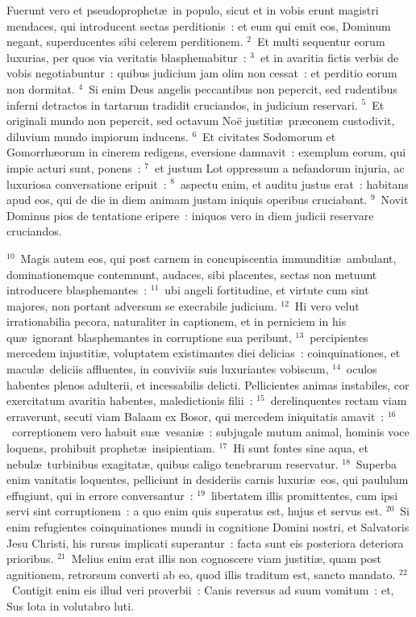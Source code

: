 \lettrine[lines=3,image=true,loversize=0.05,lraise=-0.03]{F}{}uerunt vero et pseudoprophet\ae\ in populo, sicut et in vobis erunt magistri mendaces, qui introducent sectas perditionis~: et eum qui emit eos, Dominum negant, superducentes sibi celerem perditionem.
${}^{2}$~Et multi sequentur eorum luxurias, per quos via veritatis blasphemabitur~:
${}^{3}$~et in avaritia fictis verbis de vobis negotiabuntur~: quibus judicium jam olim non cessat~: et perditio eorum non dormitat.
${}^{4}$~Si enim Deus angelis peccantibus non pepercit, sed rudentibus inferni detractos in tartarum tradidit cruciandos, in judicium reservari.
${}^{5}$~Et originali mundo non pepercit, sed octavum No\"e justiti\ae\ pr\ae conem custodivit, diluvium mundo impiorum inducens.
${}^{6}$~Et civitates Sodomorum et Gomorrh\ae orum in cinerem redigens, eversione damnavit~: exemplum eorum, qui impie acturi sunt, ponens~:
${}^{7}$~et justum Lot oppressum a nefandorum injuria, ac luxuriosa conversatione eripuit~:
${}^{8}$~aspectu enim, et auditu justus erat~: habitans apud eos, qui de die in diem animam justam iniquis operibus cruciabant.
${}^{9}$~Novit Dominus pios de tentatione eripere~: iniquos vero in diem judicii reservare cruciandos.


${}^{10}$~Magis autem eos, qui post carnem in concupiscentia immunditi\ae\ ambulant, dominationemque contemnunt, audaces, sibi placentes, sectas non metuunt introducere blasphemantes~:
${}^{11}$~ubi angeli fortitudine, et virtute cum sint majores, non portant adversum se execrabile judicium.
${}^{12}$~Hi vero velut irrationabilia pecora, naturaliter in captionem, et in perniciem in his qu\ae\ ignorant blasphemantes in corruptione sua peribunt,
${}^{13}$~percipientes mercedem injustiti\ae , voluptatem existimantes diei delicias~: coinquinationes, et macul\ae\ deliciis affluentes, in conviviis suis luxuriantes vobiscum,
${}^{14}$~oculos habentes plenos adulterii, et incessabilis delicti. Pellicientes animas instabiles, cor exercitatum avaritia habentes, maledictionis filii~:
${}^{15}$~derelinquentes rectam viam erraverunt, secuti viam Balaam ex Bosor, qui mercedem iniquitatis amavit~:
${}^{16}$~correptionem vero habuit su\ae\ vesani\ae~: subjugale mutum animal, hominis voce loquens, prohibuit prophet\ae\ insipientiam.
${}^{17}$~Hi sunt fontes sine aqua, et nebul\ae\ turbinibus exagitat\ae , quibus caligo tenebrarum reservatur.
${}^{18}$~Superba enim vanitatis loquentes, pelliciunt in desideriis carnis luxuri\ae\ eos, qui paululum effugiunt, qui in errore conversantur~:
${}^{19}$~libertatem illis promittentes, cum ipsi servi sint corruptionem~: a quo enim quis superatus est, hujus et servus est.
${}^{20}$~Si enim refugientes coinquinationes mundi in cognitione Domini nostri, et Salvatoris Jesu Christi, his rursus implicati superantur~: facta sunt eis posteriora deteriora prioribus.
${}^{21}$~Melius enim erat illis non cognoscere viam justiti\ae , quam post agnitionem, retrorsum converti ab eo, quod illis traditum est, sancto mandato.
${}^{22}$~Contigit enim eis illud veri proverbii~: Canis reversus ad suum vomitum~: et, Sus lota in volutabro luti.

